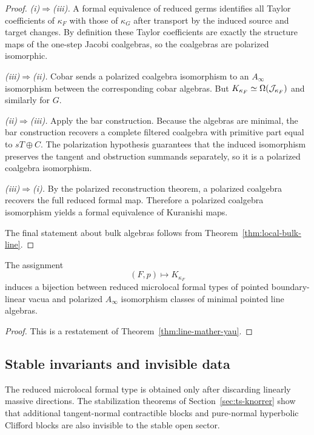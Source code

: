 \begin{proof}
\emph{(i)$\Rightarrow$(iii).}
A formal equivalence of reduced germs identifies all Taylor coefficients of $\kappa_F$ with those of $\kappa_G$ after transport by the induced source and target changes. By definition these Taylor coefficients are exactly the structure maps of the one-step Jacobi coalgebras, so the coalgebras are polarized isomorphic.

\emph{(iii)$\Rightarrow$(ii).}
Cobar sends a polarized coalgebra isomorphism to an $A_\infty$ isomorphism between the corresponding cobar algebras. But $K_{\kappa_F}\simeq \operatorname{\Omega}(\mathcal J_{\kappa_F})$ and similarly for $G$.

\emph{(ii)$\Rightarrow$(iii).}
Apply the bar construction. Because the algebras are minimal, the bar construction recovers a complete filtered coalgebra with primitive part equal to $sT\oplus C$. The polarization hypothesis guarantees that the induced isomorphism preserves the tangent and obstruction summands separately, so it is a polarized coalgebra isomorphism.

\emph{(iii)$\Rightarrow$(i).}
By the polarized reconstruction theorem, a polarized coalgebra recovers the full reduced formal map. Therefore a polarized coalgebra isomorphism yields a formal equivalence of Kuranishi maps.

The final statement about bulk algebras follows from Theorem~\ref{thm:local-bulk-line}.
\end{proof}

\begin{corollary}\label{cor:microlocal-classification}
The assignment
\[
(F,p)\longmapsto K_{\kappa_F}
\]
induces a bijection between reduced microlocal formal types of pointed boundary-linear vacua and polarized $A_\infty$ isomorphism classes of minimal pointed line algebras.
\end{corollary}

\begin{proof}
This is a restatement of Theorem~\ref{thm:line-mather-yau}.
\end{proof}

\subsection{Stable invariants and invisible data}

The reduced microlocal formal type is obtained only after discarding linearly massive directions. The stabilization theorems of Section~\ref{sec:ts-knorrer} show that additional tangent-normal contractible blocks and pure-normal hyperbolic Clifford blocks are also invisible to the stable open sector.

